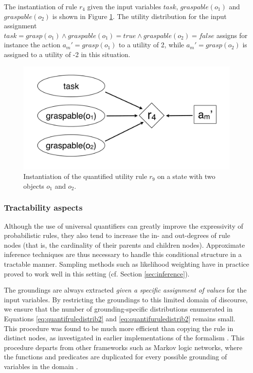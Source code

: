 The instantiation of rule $r_4$ given the input variables $\mathit{task}$, $\mathit{graspable}(o_1)$ and $\mathit{graspable}(o_2)$ is shown in Figure  \ref{fig:quantinstantitionutil}.  The utility distribution for the input assignment $\mathit{task}\!=\!\mathit{grasp}(o_1) \land \mathit{graspable}(o_1) \!=\!\mathit{true} \land \mathit{graspable}(o_2)\!=\!\mathit{false}$ assigns for instance the action $a_m'\!=\!\mathit{grasp}(o_1)$ to a utility of 2, while $a_m'\!=\!\mathit{grasp(o_2)}$ is assigned to a utility of -2 in this situation.

\begin{figure}[ht]
\centering
\includegraphics[scale=0.25]{imgs/quantutilruleinstantiation.pdf}
\caption{Instantiation of the quantified utility rule $r_9$ on a state with two objects $o_1$ and $o_2$.}
\label{fig:quantinstantitionutil}
\end{figure}

\subsubsection*{Tractability aspects}

Although the use of universal quantifiers can greatly improve the expressivity of probabilistic rules, they also tend to increase the in- and out-degrees of rule nodes (that is, the cardinality of their parents and children nodes). Approximate inference techniques are thus necessary to handle this conditional structure in a tractable manner. Sampling methods such as likelihood weighting have in practice proved to work well in this setting (cf. Section \ref{sec:inference}).

The groundings are always extracted \textit{given a specific assignment of values} for the input variables. By restricting the groundings to this limited domain of discourse, we ensure that the number of grounding-specific distributions enumerated in Equations \eqref{eq:quantifruledistrib2} and \eqref{eq:quantifuruledistrib2} remains small.   This procedure was found to be much more efficient than copying the rule in distinct nodes, as investigated in earlier implementations of the formalism \citep{relational-apl2012}.  This procedure departs from other frameworks such as Markov logic networks, where the functions and predicates are duplicated for every possible grounding of variables in the domain \citep{Richardson:2006}.


